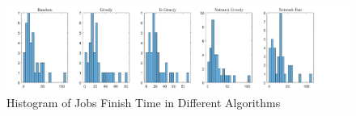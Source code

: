 \begin{figure}[htb]
\includegraphics[width=1.1\textwidth]{figure/fig-hist.png}
\centering
\caption{Histogram of Jobs Finish Time in Different Algorithms} \label{fig-hist}
\end{figure}
